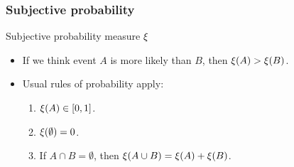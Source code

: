 \begin{frame}
  \frametitle{Subjective probability}
  \begin{block}{Subjective probability measure $\xi$}
    \begin{itemize}
    \item If we think event $A$ is more likely than $B$, then $\xi(A) > \xi(B)$.
    \item Usual rules of probability apply:
      \begin{enumerate}
      \item $\xi(A) \in [0,1]$.
      \item $\xi(\emptyset) = 0$.
      \item If $A \cap B = \emptyset$, then $\xi(A \cup B) = \xi(A) + \xi(B)$.
      \end{enumerate}
    \end{itemize}
  \end{block}
\end{frame}


